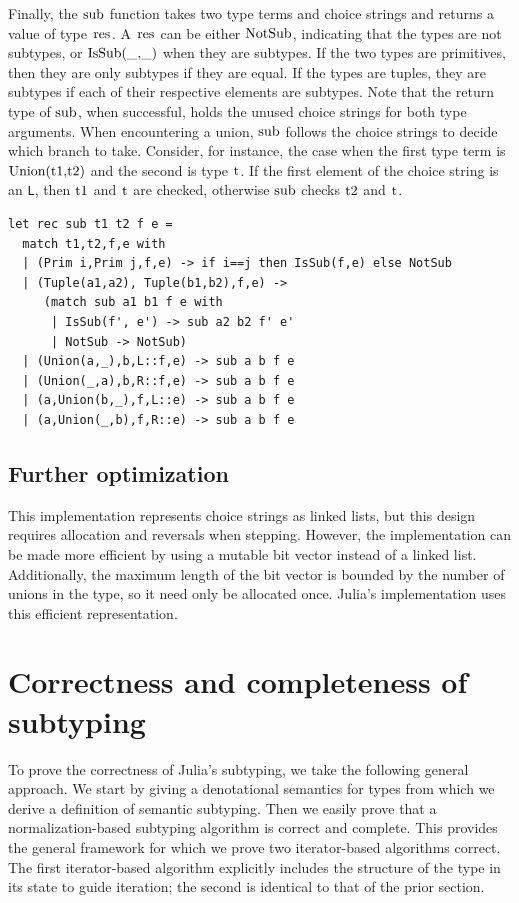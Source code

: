 \documentclass[a4paper,english]{lipics-v2019}
\renewcommand{\L}{{\tt L}\xspace}
\renewcommand{\c}[1]{\ensuremath{\text{\lstinline{#1}}}\xspace}
\begin{document}
\noindent
Finally, the \c{sub} function takes two type terms and choice strings and
returns a value of type \c{res}. A \c{res} can be either \c{NotSub}, indicating that the
types are not subtypes, or \c{IsSub(_,_)} when they are subtypes. If the two types
are primitives, then they are only subtypes if they are equal. If the types
are tuples, they are subtypes if each of their respective elements are subtypes. Note
that the return type of \c{sub}, when successful, holds the unused choice
strings for both type arguments. When encountering a union, \c{sub} 
follows the choice strings to decide which branch to take. Consider, for
instance, the case when the first type term is \c{Union(t1,t2)} and the
second is type \c{t}. If the first element of the choice string is an \L,
then \c{t1} and \c{t} are checked, otherwise \c{sub} checks \c{t2}
and \c{t}.

\begin{lstlisting}
let rec sub t1 t2 f e =
  match t1,t2,f,e with 
  | (Prim i,Prim j,f,e) -> if i==j then IsSub(f,e) else NotSub
  | (Tuple(a1,a2), Tuple(b1,b2),f,e) ->
     (match sub a1 b1 f e with
      | IsSub(f', e') -> sub a2 b2 f' e'
      | NotSub -> NotSub)
  | (Union(a,_),b,L::f,e) -> sub a b f e
  | (Union(_,a),b,R::f,e) -> sub a b f e
  | (a,Union(b,_),f,L::e) -> sub a b f e
  | (a,Union(_,b),f,R::e) -> sub a b f e
\end{lstlisting}

\subsection{Further optimization}

This implementation represents choice strings as linked lists, but this design
requires allocation and reversals when stepping. However, the implementation
can be made more efficient by using a mutable bit vector instead of a linked
list. Additionally, the maximum length of the bit vector is bounded by the
number of unions in the type, so it need only be allocated once. Julia's
implementation uses this efficient representation.

\section{Correctness and completeness of subtyping}

To prove the correctness of Julia's subtyping, we take the following general
approach. We start by giving a denotational semantics for types from which
we derive a definition of semantic subtyping. Then we easily prove that a
normalization-based subtyping algorithm is correct and complete. This provides
the general framework for which we prove two iterator-based algorithms correct.
The first iterator-based algorithm explicitly includes the structure of the type in
its state to guide iteration; the second is identical to that of the prior section.
\end{document}
